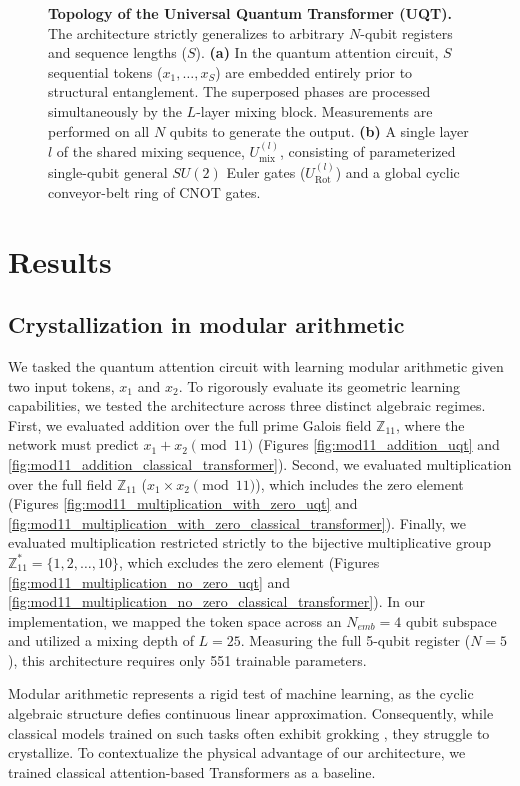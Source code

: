 \documentclass[11pt, a4paper]{article}
\begin{document}
\begin{figure}[tb!]
    \caption{\textbf{Topology of the Universal Quantum Transformer (UQT).} The architecture strictly generalizes to arbitrary $N$-qubit registers and sequence lengths ($S$). \textbf{(a)} In the quantum attention circuit, $S$ sequential tokens ($x_1, \dots, x_S$) are embedded entirely prior to structural entanglement. The superposed phases are processed simultaneously by the $L$-layer mixing block. Measurements are performed on all $N$ qubits to generate the output. \textbf{(b)} A single layer $l$ of the shared mixing sequence, $U_{\mathrm{mix}}^{(l)}$, consisting of parameterized single-qubit general $SU(2)$ Euler gates ($U_{\mathrm{Rot}}^{(l)}$) and a global cyclic conveyor-belt ring of CNOT gates.}
    \label{fig:circuits}
\end{figure}

\section*{Results}
\subsection*{Crystallization in modular arithmetic}
We tasked the quantum attention circuit with learning modular arithmetic given two input tokens, $x_1$ and $x_2$. To rigorously evaluate its geometric learning capabilities, we tested the architecture across three distinct algebraic regimes. First, we evaluated addition over the full prime Galois field $\mathbb{Z}_{11}$, where the network must predict $x_1 + x_2 \pmod{11}$ (Figures \ref{fig:mod11_addition_uqt} and \ref{fig:mod11_addition_classical_transformer}). Second, we evaluated multiplication over the full field $\mathbb{Z}_{11}$ ($x_1 \times x_2 \pmod{11}$), which includes the zero element (Figures \ref{fig:mod11_multiplication_with_zero_uqt} and \ref{fig:mod11_multiplication_with_zero_classical_transformer}). Finally, we evaluated multiplication restricted strictly to the bijective multiplicative group $\mathbb{Z}_{11}^* = \{1, 2, \dots, 10\}$, which excludes the zero element (Figures \ref{fig:mod11_multiplication_no_zero_uqt} and \ref{fig:mod11_multiplication_no_zero_classical_transformer}). In our implementation, we mapped the token space across an $N_{emb}=4$ qubit subspace and utilized a mixing depth of $L=25$. Measuring the full 5-qubit register ($N=5$), this architecture requires only 551 trainable parameters.

Modular arithmetic represents a rigid test of machine learning, as the cyclic algebraic structure defies continuous linear approximation. Consequently, while classical models trained on such tasks often exhibit grokking \cite{power2022grokking}, they struggle to crystallize. To contextualize the physical advantage of our architecture, we trained classical attention-based Transformers as a baseline.
\end{document}
